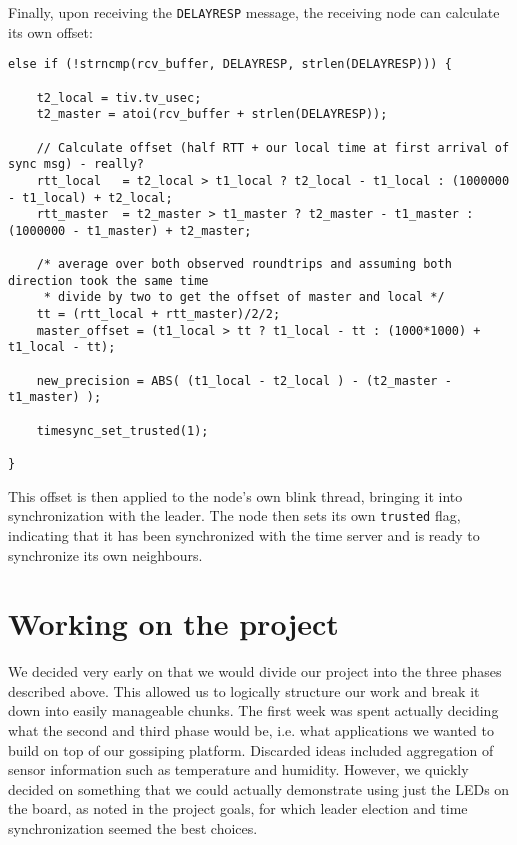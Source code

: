 \documentclass[11pt,
  a4paper,
  ngerman,
  BCOR=7mm
]{scrartcl}
\begin{document}
Finally, upon receiving the \lstinline!DELAYRESP! message, the receiving
node can calculate its own offset:

\begin{lstlisting}
else if (!strncmp(rcv_buffer, DELAYRESP, strlen(DELAYRESP))) {

    t2_local = tiv.tv_usec;
    t2_master = atoi(rcv_buffer + strlen(DELAYRESP));

    // Calculate offset (half RTT + our local time at first arrival of sync msg) - really?
    rtt_local   = t2_local > t1_local ? t2_local - t1_local : (1000000 - t1_local) + t2_local;
    rtt_master  = t2_master > t1_master ? t2_master - t1_master : (1000000 - t1_master) + t2_master;

    /* average over both observed roundtrips and assuming both direction took the same time
     * divide by two to get the offset of master and local */
    tt = (rtt_local + rtt_master)/2/2;
    master_offset = (t1_local > tt ? t1_local - tt : (1000*1000) + t1_local - tt);

    new_precision = ABS( (t1_local - t2_local ) - (t2_master - t1_master) );

    timesync_set_trusted(1);

}
\end{lstlisting}

This offset is then applied to the node's own blink thread, bringing it
into synchronization with the leader. The node then sets its own
\lstinline!trusted! flag, indicating that it has been synchronized with
the time server and is ready to synchronize its own neighbours.

\newpage

\section*{Working on the project} %
\label{sec:working_on_project}
We decided very early on that we would divide our project into the three
phases described above. This allowed us to logically structure our work
and break it down into easily manageable chunks. The first week was
spent actually deciding what the second and third phase would be, i.e.
what applications we wanted to build on top of our gossiping platform.
Discarded ideas included aggregation of sensor information such as
temperature and humidity. However, we quickly decided on something that
we could actually demonstrate using just the LEDs on the board, as noted
in the project goals, for which leader election and time synchronization
seemed the best choices.
\end{document}
